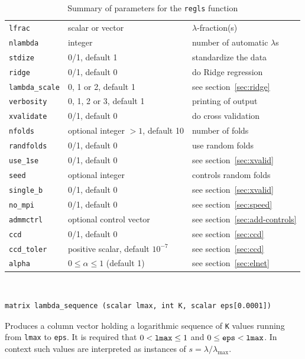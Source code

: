 \documentclass{article}
\newenvironment{funcdoc}
{\noindent\hrulefill\\[-12pt]}
{\medbreak}
\begin{document}
\begin{table}[htbp]
  \centering
  \begin{tabular}{lll}
    \texttt{lfrac} & scalar or vector & $\lambda$-fraction(s) \\
    \texttt{nlambda} & integer & number of automatic $\lambda$s \\
    \texttt{stdize} & 0/1, default 1 & standardize the data \\
    \texttt{ridge} & 0/1, default 0 & do Ridge regression \\
    \texttt{lambda\_scale} & 0, 1 or 2, default 1 & see section~\ref{sec:ridge} \\
    \texttt{verbosity} & 0, 1, 2 or 3, default 1 & printing of output\\
    \texttt{xvalidate} & 0/1, default 0 & do cross validation\\
    \texttt{nfolds} & optional integer $>1$, default 10 & number of
                                                          folds \\
    \texttt{randfolds} & 0/1, default 0 & use random folds\\
    \texttt{use\_1se} & 0/1, default 0 & see section~\ref{sec:xvalid} \\
    \texttt{seed} & optional integer & controls random folds\\
    \texttt{single\_b} & 0/1, default 0 & see section~\ref{sec:xvalid}\\
    \texttt{no\_mpi} & 0/1, default 0 & see section~\ref{sec:speed}\\
    \texttt{admmctrl} & optional control vector & see
                                                  section~\ref{sec:add-controls} \\
    \texttt{ccd} & 0/1, default 0 & see section~\ref{sec:ccd} \\
    \texttt{ccd\_toler} & positive scalar, default $10^{-7}$ & see
                                                               section~\ref{sec:ccd}\\
    \texttt{alpha} & $0 \leq \alpha \leq 1$ (default 1) & see
                                                               section~\ref{sec:elnet}
  \end{tabular}
  \caption{Summary of parameters for the \texttt{regls} function}
  \label{tab:regls-parms}
\end{table}

\begin{funcdoc}
\begin{verbatim}
matrix lambda_sequence (scalar lmax, int K, scalar eps[0.0001])
\end{verbatim}
  Produces a column vector holding a logarithmic sequence of
  \texttt{K} values running from \texttt{lmax} to \texttt{eps}. It is
  required that $0 < \mbox{\texttt{lmax}} \le 1$ and
  $0 \le \mbox{\texttt{eps}} < \mbox{\texttt{lmax}}$. In context such
  values are interpreted as instances of $s = \lambda/\lambda_{\max}$.
\end{funcdoc}
\end{document}
